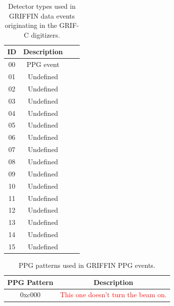 \documentclass[letterpaper,12pt,notitlepage]{report}
\begin{document}
\begin{table}
\begin{center}
\begin{tabular}{cccl}
\hline
\hline
ID & Description\\
\hline
00 & PPG event \\
01 & Undefined\\
02 & Undefined\\
03 & Undefined\\
04 & Undefined\\
05 & Undefined\\
06 & Undefined\\
07 & Undefined\\
08 & Undefined\\
09 & Undefined\\
10 & Undefined\\
11 & Undefined\\
12 & Undefined\\
13 & Undefined\\
14 & Undefined\\
15 & Undefined\\
\hline
\hline
\end{tabular}
\caption{Detector types used in GRIFFIN data events originating in the GRIF-C digitizers.}
\label{table.dettype_other}
\end{center}
\end{table}

\begin{table}
\begin{center}
\begin{tabular}{cc}
\hline
\hline
PPG Pattern & Description\\
\hline
0xc000 & \textcolor{red}{This one doesn't turn the beam on.}\\
\hline
\hline
\end{tabular}
\caption{PPG patterns used in GRIFFIN PPG events.}
\label{table.ppg}
\end{center}
\end{table}
\end{document}
